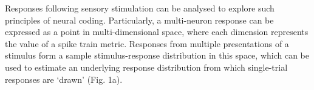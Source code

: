 \documentclass{article}
\begin{document}


Responses following sensory stimulation can be analysed to explore such principles of neural coding. 
Particularly, a multi-neuron response can be expressed as a point in multi-dimensional space, where each dimension represents the value of a spike train metric. Responses from multiple presentations of a stimulus form a sample stimulus-response distribution in this space, which can be used to estimate an underlying response distribution from which single-trial responses are `drawn' (Fig. 1a).
\end{document}
